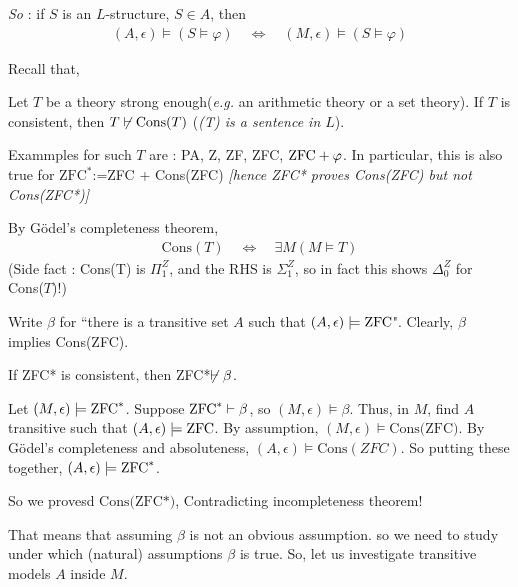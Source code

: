 \documentclass[12pt,a4paper]{article}
\newenvironment{proof}
{\begin{changemargin}{0.5cm}{0.5cm} 
	}%
	{\end{changemargin}
}
\newenvironment{p}
{\begin{proof} 
	}%
	{\end{proof}
}
\begin{document}
\quad \emph{So} : if $S$ is an $L$-structure, $S\in A$, then 
\begin{align*}
(A, \epsilon) \models (S\models \varphi) \quad \Leftrightarrow \quad(M, \epsilon)\models (S\models \varphi)
\end{align*}
\s

Recall that,

 Let $T$ be a theory strong enough(\textit{e.g.} an arithmetic theory or a set theory). If $T$ is consistent, then $T \not\vdash \text{Cons}(T)$ (\emph{(T) is a sentence in $L$}).

\quad Exammples for such $T$ are : PA, Z, ZF, ZFC, $\text{ZFC} +\varphi$. In particular, this is also true for $\text{ZFC}^*$:=ZFC + Cons(ZFC) \emph{[hence ZFC* proves Cons(ZFC) but not Cons(ZFC*)]}
\s

By G\"odel's completeness theorem,
\begin{align*}
\text{Cons}(T) \quad \Leftrightarrow \quad \exists M (M \models T)
\end{align*} 
(Side fact : Cons(T) is $\Pi_1^Z$, and the RHS is $\Sigma_1^Z$, so in fact this shows $\Delta_0^Z$ for Cons($T$)!)
\s

 Write $\beta$ for ``there is a transitive set $A$ such that $(A, \epsilon) \models \text{ZFC}$". Clearly, $\beta$ implies Cons(ZFC).
\s

\thm If ZFC* is consistent, then ZFC*$\not\vdash \beta$.
\begin{p}
\pf Let $(M, \epsilon) \models \text{ZFC}^*$. Suppose $\text{ZFC}^* \vdash \beta$, so $(M, \epsilon) \models \beta$. Thus, in $M$, find $A$ transitive such that $(A, \epsilon) \models \text{ZFC}$. By assumption, $(M, \epsilon) \models \text{Cons(ZFC)}$. By G\"{o}del's completeness and absoluteness, $(A, \epsilon) \models \text{Cons}(ZFC)$. So putting these together, $(A, \epsilon) \models \text{ZFC}^*$.

\quad So we provesd $\text{Cons(ZFC*)}$, Contradicting incompleteness theorem!

\eop
\end{p}
\s

That means that assuming $\beta$ is not an obvious assumption. so we need to study under which (natural) assumptions $\beta$ is true. So, let us investigate transitive models $A$ inside $M$.
\end{document}
